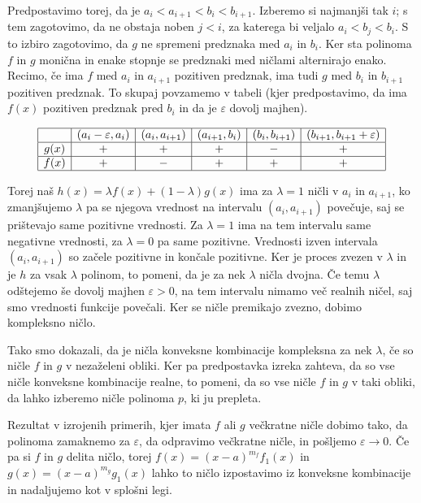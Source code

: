 \begin{dokaz}
    Predpostavimo torej, da je \(a_i < a_{i+1} < b_i < b_{i+1}\). Izberemo si najmanjši tak \(i\); s tem zagotovimo, da ne obstaja noben \(j<i\), za katerega bi veljalo \(a_i < b_j < b_i\). S to izbiro zagotovimo, da \(g\) ne spremeni predznaka med \(a_i\) in \(b_i\). Ker sta polinoma \(f\) in \(g\) monična in enake stopnje se predznaki med ničlami alternirajo enako. Recimo, če ima \(f\) med \(a_i\) in \(a_{i+1}\) pozitiven predznak, ima tudi \(g\) med \(b_i\) in \(b_{i+1}\) pozitiven predznak. To skupaj povzamemo v tabeli (kjer predpostavimo, da ima \(f(x)\) pozitiven predznak pred \(b_i\) in da je \(\varepsilon\) dovolj majhen).
    \begin{center}
        \begin{align*}
            \begin{array}{|c|c|c|c|c|c|}
                \hline
                     & (a_i - \varepsilon, a_i) & (a_i, a_{i+1}) & (a_{i+1}, b_i) & (b_i, b_{i+1}) & (b_{i+1}, b_{i+1} + \varepsilon) \\ \hline
                g(x) & +                        & +          & +          & -          & +                        \\ \hline
                f(x) & +                        & -          & +          & +          & +                        \\ \hline
            \end{array}
        \end{align*}
    \end{center}
    Torej naš \(h(x)=\lambda f(x) + (1-\lambda) g(x)\) ima za \(\lambda = 1\) ničli v \(a_i\) in \(a_{i+1}\), ko zmanjšujemo \(\lambda\) pa se njegova vrednost na intervalu \((a_i, a_{i+1})\) povečuje, saj se prištevajo same pozitivne vrednosti. Za \(\lambda=1\) ima na tem intervalu same negativne vrednosti, za \(\lambda=0\) pa same pozitivne. Vrednosti izven intervala \((a_i, a_{i+1})\) so začele pozitivne in končale pozitivne. Ker je proces zvezen v \(\lambda\) in je \(h\) za vsak \(\lambda\) polinom, to pomeni, da je za nek \(\lambda\) ničla dvojna. Če temu \(\lambda\) odštejemo še dovolj majhen \(\varepsilon>0\), na tem intervalu nimamo več realnih ničel, saj smo vrednosti funkcije povečali. Ker se ničle premikajo zvezno, dobimo kompleksno ničlo.

    Tako smo dokazali, da je ničla konveksne kombinacije kompleksna za nek \(\lambda\), če so ničle \(f\) in \(g\) v nezaželeni obliki. Ker pa predpostavka izreka zahteva, da so vse ničle konveksne kombinacije realne, to pomeni, da so vse ničle \(f\) in \(g\) v taki obliki, da lahko izberemo ničle polinoma \(p\), ki ju prepleta.

    Rezultat v izrojenih primerih, kjer imata \(f\) ali \(g\) večkratne ničle dobimo tako, da polinoma zamaknemo za \(\varepsilon\), da odpravimo večkratne ničle, in pošljemo \(\varepsilon\to 0\). Če pa si \(f\) in \(g\) delita ničlo, torej \(f(x) = (x-a)^{m_f} f_1(x)\) in \(g(x) = (x-a)^{m_g} g_1(x)\) lahko to ničlo izpostavimo iz konveksne kombinacije in nadaljujemo kot v splošni legi. 
\end{dokaz}

